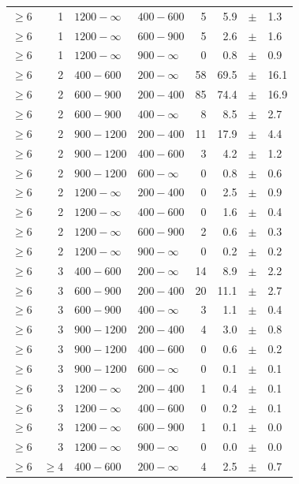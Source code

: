 \begin{table}[!h]
\begin{tabular}{rrllrrcl}
$\geq 6$ & 1 & $1200- \infty$ & $400-600$ &      5 &      5.9 &$\pm$&    1.3 \\
$\geq 6$ & 1 & $1200- \infty$ & $600-900$ &      5 &      2.6 &$\pm$&    1.6 \\
$\geq 6$ & 1 & $1200- \infty$ & $900-\infty$ &      0 &      0.8 &$\pm$&    0.9 \\
$\geq 6$\T & 2 & $ 400- 600$ & $200-\infty$ &     58 &     69.5 &$\pm$&   16.1 \\
$\geq 6$\T & 2 & $ 600- 900$ & $200-400$ &     85 &     74.4 &$\pm$&   16.9 \\
$\geq 6$ & 2 & $ 600- 900$ & $400-\infty$ &      8 &      8.5 &$\pm$&    2.7 \\
$\geq 6$\T & 2 & $ 900-1200$ & $200-400$ &     11 &     17.9 &$\pm$&    4.4 \\
$\geq 6$ & 2 & $ 900-1200$ & $400-600$ &      3 &      4.2 &$\pm$&    1.2 \\
$\geq 6$ & 2 & $ 900-1200$ & $600-\infty$ &      0 &      0.8 &$\pm$&    0.6 \\
$\geq 6$\T & 2 & $1200- \infty$ & $200-400$ &      0 &      2.5 &$\pm$&    0.9 \\
$\geq 6$ & 2 & $1200- \infty$ & $400-600$ &      0 &      1.6 &$\pm$&    0.4 \\
$\geq 6$ & 2 & $1200- \infty$ & $600-900$ &      2 &      0.6 &$\pm$&    0.3 \\
$\geq 6$ & 2 & $1200- \infty$ & $900-\infty$ &      0 &      0.2 &$\pm$&    0.2 \\
$\geq 6$\T & 3 & $ 400- 600$ & $200-\infty$ &     14 &      8.9 &$\pm$&    2.2 \\
$\geq 6$\T & 3 & $ 600- 900$ & $200-400$ &     20 &     11.1 &$\pm$&    2.7 \\
$\geq 6$ & 3 & $ 600- 900$ & $400-\infty$ &      3 &      1.1 &$\pm$&    0.4 \\
$\geq 6$\T & 3 & $ 900-1200$ & $200-400$ &      4 &      3.0 &$\pm$&    0.8 \\
$\geq 6$ & 3 & $ 900-1200$ & $400-600$ &      0 &      0.6 &$\pm$&    0.2 \\
$\geq 6$ & 3 & $ 900-1200$ & $600-\infty$ &      0 &      0.1 &$\pm$&    0.1 \\
$\geq 6$\T & 3 & $1200- \infty$ & $200-400$ &      1 &      0.4 &$\pm$&    0.1 \\
$\geq 6$ & 3 & $1200- \infty$ & $400-600$ &      0 &      0.2 &$\pm$&    0.1 \\
$\geq 6$ & 3 & $1200- \infty$ & $600-900$ &      1 &      0.1 &$\pm$&    0.0 \\
$\geq 6$ & 3 & $1200- \infty$ & $900-\infty$ &      0 &      0.0 &$\pm$&    0.0 \\
$\geq 6$\T & $\geq 4$ & $ 400- 600$ & $200-\infty$ &      4 &      2.5 &$\pm$&    0.7 \\
    \hline
  \end{tabular}
\end{table}

